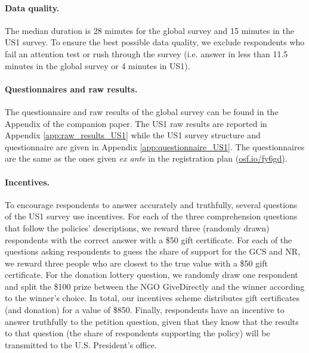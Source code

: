 \begin{small}
\paragraph{\small Data quality.} %
The median duration is 28 minutes for the global survey and 15 minutes in the US1 survey. To ensure the best possible data quality, we exclude respondents who fail an attention test or rush through the survey (i.e. answer in less than 11.5 minutes in the global survey or 4 minutes in US1). 

\paragraph{\small Questionnaires and raw results.} %
The questionnaire and raw results of the global survey can be found in the Appendix of the companion paper.\cite{dechezlepretre_fighting_2022} The US1 raw results are reported in Appendix \ref{app:raw_results_US1} while the US1 survey structure and questionnaire are given in Appendix \ref{app:questionnaire_US1}. The questionnaires are the same as the ones given \textit{ex ante} in the registration plan (\href{https://osf.io/fy6gd}{osf.io/fy6gd}).

\paragraph{\small Incentives.} %
To encourage respondents to answer accurately and truthfully, several questions of the US1 survey use incentives. For each of the three comprehension questions that follow the policies' descriptions, we reward three (randomly drawn) respondents with the correct answer with a \$50 gift certificate. For each of the questions asking respondents to guess the share of support for the GCS and NR, we reward three people who are closest to the true value with a \$50 gift certificate. For the donation lottery question, we randomly draw one respondent and split the \$100 prize between the NGO GiveDirectly and the winner according to the winner's choice. In total, our incentives scheme distributes gift certificates (and donation) for a value of \$850. Finally, respondents have an incentive to answer truthfully to the petition question, given that they know that the results to that question (the share of respondents supporting the policy) will be transmitted to the U.S. President's office.


\end{small}
